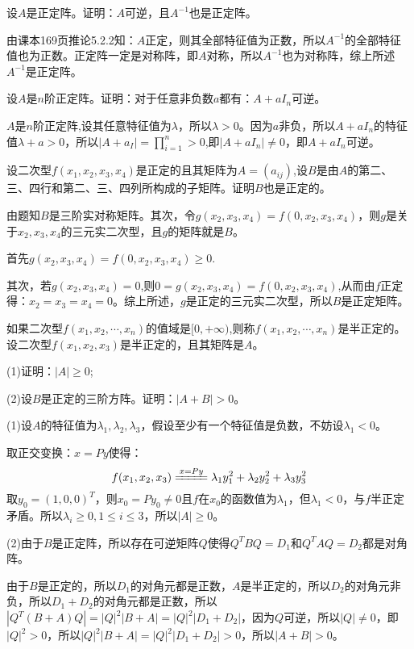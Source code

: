 \documentclass[a4paper]{report}
\begin{document}
\EX 设$A$是正定阵。证明：$A$可逆，且$A^{-1}$也是正定阵。

\begin{zhengming}
由课本169页推论5.2.2知：$A$正定，则其全部特征值为正数，所以$A^{-1}$的全部特征值也为正数。正定阵一定是对称阵，即$A$对称，所以$A^{-1}$也为对称阵，综上所述$A^{-1}$是正定阵。
\end{zhengming}

\EX 设$A$是$n$阶正定阵。证明：对于任意非负数$a$都有：$A+aI_n$可逆。

\begin{zhengming}
$A$是$n$阶正定阵,设其任意特征值为$\lambda$，所以$\lambda>0$。因为$a$非负，所以$A+aI_{n}$的特征值$\lambda+a>0$，所以$|A+a_I|=\prod\limits_{i=1}^{n}>0$,即$|A+aI_n|\neq0$，即$A+aI_n$可逆。
\end{zhengming}

\EX 设二次型$f(x_1,x_2,x_3,x_4)$是正定的且其矩阵为$A=(a_{ij})$,设$B$是由$A$的第二、三、四行和第二、三、四列所构成的子矩阵。证明$B$也是正定的。

\begin{zhengming}
由题知$B$是三阶实对称矩阵。其次，令$g(x_2,x_3,x_4)=f(0,x_2,x_3,x_4)$，则$g$是关于$x_2,x_3,x_4$的三元实二次型，且$g$的矩阵就是$B$。

首先$g(x_2,x_3,x_4)=f(0,x_2,x_3,x_4)\geq 0$.

其次，若$g(x_2,x_3,x_4)=0$,则$0=g(x_2,x_3,x_4)=f(0,x_2,x_3,x_4)$,从而由$f$正定得：$x_2=x_3=x_4=0$。综上所述，$g$是正定的三元实二次型，所以$B$是正定矩阵。
\end{zhengming}

\EX 如果二次型$f(x_1,x_2,\cdots,x_n)$的值域是$[0,+\infty)$,则称$f(x_1,x_2,\cdots,x_n)$是半正定的。设二次型$f(x_1,x_2,x_3)$是半正定的，且其矩阵是$A$。

(1)证明：$|A|\geq 0$;

(2)设$B$是正定的三阶方阵。证明：$|A+B|> 0$。

\begin{zhengming}
(1)设$A$的特征值为$\lambda_1,\lambda_2,\lambda_3$，假设至少有一个特征值是负数，不妨设$\lambda_1<0$。

取正交变换：$x=Py$使得：
\begin{equation*}
f(x_1,x_2,x_3)\xlongequal{x=Py}\lambda_1y_1^2+\lambda_2y_2^2+\lambda_3y_3^2
\end{equation*}
取$y_0=(1,0,0)^T$，则$x_0=Py_0\neq0$且$f$在$x_0$的函数值为$\lambda_1$，但$\lambda_1<0$，与$f$半正定矛盾。所以$\lambda_i\geq0,1\leq i\leq3$，所以$|A|\geq0$。

(2)由于$B$是正定阵，所以存在可逆矩阵$Q$使得$Q^TBQ=D_1$和$Q^TAQ=D_2$都是对角阵。

由于$B$是正定的，所以$D_1$的对角元都是正数，$A$是半正定的，所以$D_2$的对角元非负，所以$D_1+D_2$的对角元都是正数，所以$|Q^T(B+A)Q|=|Q|^2|B+A|=|Q|^2|D_1+D_2|$，因为$Q$可逆，所以$|Q|\neq0$，即$|Q|^2>0$，所以$|Q|^2|B+A|=|Q|^2|D_1+D_2|>0$，所以$|A+B|>0$。
\end{zhengming}
\end{document}
